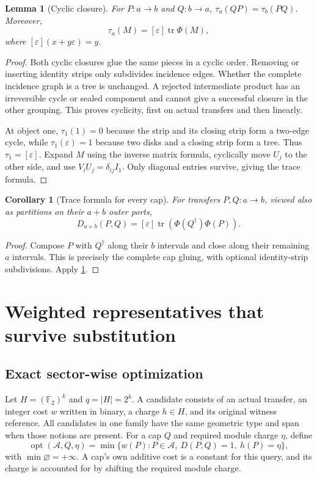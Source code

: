 \documentclass[11pt,a4paper]{article}
\newtheorem{lemma}[lemma]{Lemma}
\newtheorem{corollary}[corollary]{Corollary}
\theoremstyle{definition}
\newcommand{\F}{\mathbb F_2}
\newcommand{\tr}{\operatorname{tr}}
\newcommand{\eps}{\varepsilon}
\begin{document}
\begin{lemma}[Cyclic closure]\label{lem:trace}
For $P:a\to b$ and $Q:b\to a$, $\tau_a(QP)=\tau_b(PQ)$. Moreover,
\[
\tau_a(M)=[\eps]\tr\Phi(M),
\]
where $[\eps](x+y\eps)=y$.
\end{lemma}
\begin{proof}
Both cyclic closures glue the same pieces in a cyclic order. Removing or inserting identity strips only subdivides incidence edges. Whether the complete incidence graph is a tree is unchanged. A rejected intermediate product has an irreversible cycle or sealed component and cannot give a successful closure in the other grouping. This proves cyclicity, first on actual transfers and then linearly.

At object one, $\tau_1(1)=0$ because the strip and its closing strip form a two-edge cycle, while $\tau_1(\eps)=1$ because two disks and a closing strip form a tree. Thus $\tau_1=[\eps]$. Expand $M$ using the inverse matrix formula, cyclically move $U_j$ to the other side, and use $V_iU_j=\delta_{ij}I_1$. Only diagonal entries survive, giving the trace formula.
\end{proof}

\begin{corollary}[Trace formula for every cap]\label{cor:tracepair}
For transfers $P,Q:a\to b$, viewed also as partitions on their $a+b$ outer ports,
\begin{equation}
D_{a+b}(P,Q)
=[\eps]\tr\!\left(\Phi(Q^\dagger)\Phi(P)\right).
\label{eq:tracepair}
\end{equation}
\end{corollary}
\begin{proof}
Compose $P$ with $Q^\dagger$ along their $b$ intervals and close along their remaining $a$ intervals. This is precisely the complete cap gluing, with optional identity-strip subdivisions. Apply \cref{lem:trace}.
\end{proof}

\section{Weighted representatives that survive substitution}\label{sec:weighted}

\subsection{Exact sector-wise optimization}
Let $H=(\F)^k$ and $q=|H|=2^k$. A candidate consists of an actual transfer, an integer cost $w$ written in binary, a charge $h\in H$, and its original witness reference. All candidates in one family have the same geometric type and span when those notions are present. For a cap $Q$ and required module charge $\eta$, define
\[
\operatorname{opt}(\mathcal A,Q,\eta)
=\min\{w(P):P\in\mathcal A,\ D(P,Q)=1,\ h(P)=\eta\},
\]
with $\min\varnothing=+\infty$. A cap's own additive cost is a constant for this query, and its charge is accounted for by shifting the required module charge.
\end{document}

